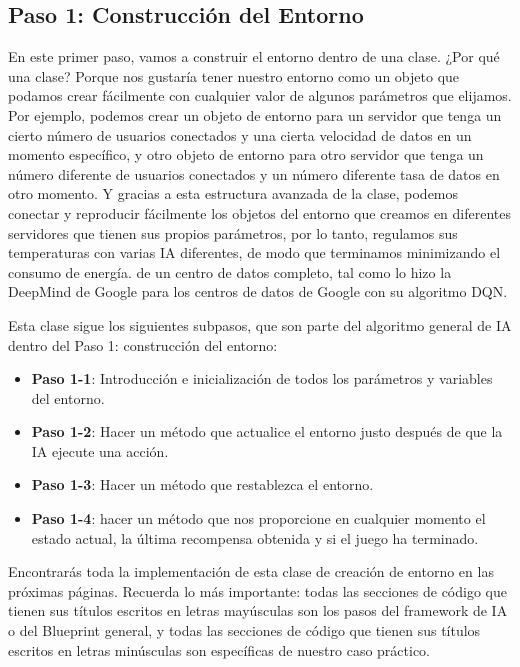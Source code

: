 \documentclass[]{book}
\providecommand{\tightlist}{%
  \setlength{\itemsep}{0pt}\setlength{\parskip}{0pt}}
\begin{document}
\hypertarget{paso-1-construcciuxf3n-del-entorno}{%
\subsection{Paso 1: Construcción del Entorno}\label{paso-1-construcciuxf3n-del-entorno}}

En este primer paso, vamos a construir el entorno dentro de una clase. ¿Por qué una clase? Porque nos gustaría tener nuestro entorno como un objeto que podamos crear fácilmente con cualquier valor de algunos parámetros que elijamos. Por ejemplo, podemos crear un objeto de entorno para un servidor que tenga un cierto número de usuarios conectados y una cierta velocidad de datos en un momento específico, y otro objeto de entorno para otro servidor que tenga un número diferente de usuarios conectados y un número diferente tasa de datos en otro momento. Y gracias a esta estructura avanzada de la clase, podemos conectar y reproducir fácilmente los objetos del entorno que creamos en diferentes servidores que tienen sus propios parámetros, por lo tanto, regulamos sus temperaturas con varias IA diferentes, de modo que terminamos minimizando el consumo de energía. de un centro de datos completo, tal como lo hizo la DeepMind de Google para los centros de datos de Google con su algoritmo DQN.

Esta clase sigue los siguientes subpasos, que son parte del algoritmo general de IA dentro del Paso 1: construcción del entorno:

\begin{itemize}
\tightlist
\item
  \textbf{Paso 1-1}: Introducción e inicialización de todos los parámetros y variables del entorno.
\item
  \textbf{Paso 1-2}: Hacer un método que actualice el entorno justo después de que la IA ejecute una acción.
\item
  \textbf{Paso 1-3}: Hacer un método que restablezca el entorno.
\item
  \textbf{Paso 1-4}: hacer un método que nos proporcione en cualquier momento el estado actual, la última recompensa obtenida y si el juego ha terminado.
\end{itemize}

Encontrarás toda la implementación de esta clase de creación de entorno en las próximas páginas. Recuerda lo más importante: todas las secciones de código que tienen sus títulos escritos en letras mayúsculas son los pasos del framework de IA o del Blueprint general, y todas las secciones de código que tienen sus títulos escritos en letras minúsculas son específicas de nuestro caso práctico.
\end{document}
